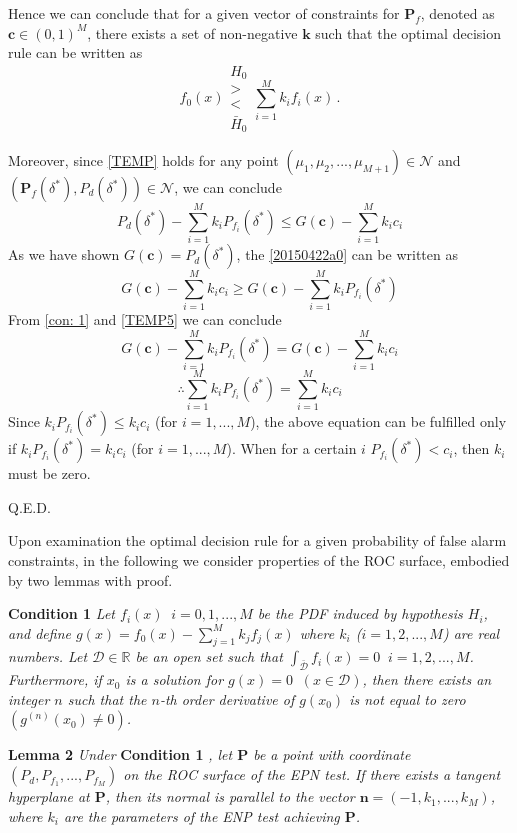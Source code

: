 Hence we can conclude that for a given vector of constraints for $\mathbf{P}_f$, denoted as $\mathbf{c} \in (0, 1)^M$, there exists a set of non-negative $\mathbf{k}$ such that 
the optimal decision rule can be written as 
\[
f_0(x) \substack{H_0 \\ > \\ < \\ \bar{H}_0 } \sum_{i=1}^{M}k_if_i(x)\,.
\]

Moreover, since \eqref{TEMP} holds for any point $(\mu_1, \mu_2, ..., \mu_{M+1}) \in \mathcal{N}$ and $(\mathbf{P}_f(\delta^\ast), P_d(\delta^\ast)) \in \mathcal{N}$, we can conclude 
\begin{equation}
P_d(\delta^\ast) - \sum_{i=1}^{M}k_iP_{f_i}(\delta^\ast) \leq G(\mathbf{c}) - \sum_{i=1}^{M}k_ic_i
\label{20150422a0}
\end{equation}
As we have shown $G(\mathbf{c}) = P_d(\delta^\ast)$, the \eqref{20150422a0} can be written as
\begin{equation}
 G(\mathbf{c}) - \sum_{i=1}^{M}k_ic_i \geq G(\mathbf{c}) - \sum_{i=1}^{M}k_iP_{f_i}(\delta^\ast)
\label{TEMP5}
\end{equation}
From \eqref{con: 1} and \eqref{TEMP5}  we can conclude
\[
G(\mathbf{c}) - \sum_{i=1}^{M}k_iP_{f_i}(\delta^\ast) =  G(\mathbf{c}) - \sum_{i=1}^{M}k_ic_i
\]
\[
\therefore  \sum_{i=1}^{M}k_iP_{f_i}(\delta^\ast) =  \sum_{i=1}^{M}k_ic_i
\]
Since $k_iP_{f_i}(\delta^\ast) \leq k_ic_i$ (for $i=1, ..., M$), the above equation can be fulfilled only if $k_iP_{f_i}(\delta^\ast) = k_ic_i$ (for $i=1, ..., M$). When for a certain $i$ $P_{f_i}(\delta^\ast) < c_i$, then $k_i$ must be zero.

Q.E.D.

Upon examination  the optimal decision rule for a given probability of false alarm constraints, in the following we consider properties of the ROC surface, embodied by two lemmas with proof.  

\noindent \textbf{Condition 1}
\textit{
\noindent Let $f_i(x) \;\;i=0, 1, ..., M$ be the PDF induced by hypothesis $H_i$, and define $g(x) = f_0(x) - \sum_{j=1}^{M} k_jf_j(x)$ where $k_i$  ($i = 1, 2, ..., M$) are real numbers. Let $\mathcal{D} \in \mathbb{R}$ be an open set such that $\int_{\bar{\mathcal{D}}}f_i(x)=0\;\;i = 1, 2, ..., M$. Furthermore,  if $x_0$ is a solution  for $g(x) = 0 \;\;(x \in \mathcal{D})$, then there exists an integer $n$ such that  the $n$-th order derivative of $g(x_0)$ is not equal to zero $(g^{(n)}(x_0) \neq 0)$.
}

\noindent \textbf{Lemma 2}
\textit{
\noindent Under}
\textbf{Condition 1}
\textit{, let $\mathbf{P}$ be a point with coordinate $(P_d, P_{f_1}, ..., P_{f_M})$ on the ROC surface of the EPN test. If there exists a tangent hyperplane at $\mathbf{P}$, then its normal is parallel to the vector $\mathbf{n} = (-1, k_1, ..., k_M)$, where $k_i$ are the parameters of the ENP test achieving $\mathbf{P}$.
}

